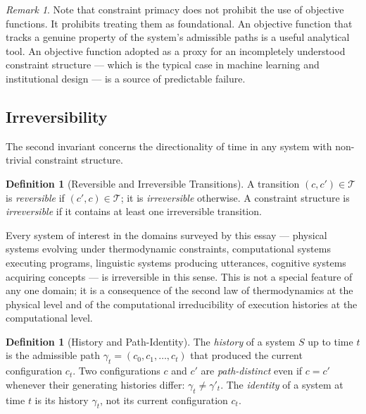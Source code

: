 \documentclass[12pt, twoside]{article}
\theoremstyle{plain}
\theoremstyle{definition}
\newtheorem{definition}[theorem]{Definition}
\theoremstyle{remark}
\newtheorem{remark}[theorem]{Remark}
\newcommand{\Trans}{\mathcal{T}}
\begin{document}
\begin{remark}
Note that constraint primacy does not prohibit the use of objective
functions.
It prohibits treating them as foundational.
An objective function that tracks a genuine property of the system's
admissible paths is a useful analytical tool.
An objective function adopted as a proxy for an incompletely understood
constraint structure — which is the typical case in machine learning and
institutional design — is a source of predictable failure.
\end{remark}

\subsection{Irreversibility}

The second invariant concerns the directionality of time in any
system with non-trivial constraint structure.

\begin{definition}[Reversible and Irreversible Transitions]
A transition $(c, c') \in \Trans$ is \emph{reversible} if
$(c', c) \in \Trans$; it is \emph{irreversible} otherwise.
A constraint structure is \emph{irreversible} if it contains at least
one irreversible transition.
\end{definition}

Every system of interest in the domains surveyed by this essay —
physical systems evolving under thermodynamic constraints,
computational systems executing programs, linguistic systems producing
utterances, cognitive systems acquiring concepts — is irreversible
in this sense.
This is not a special feature of any one domain; it is a consequence of
the second law of thermodynamics at the physical level
and of the computational irreducibility of execution histories
at the computational level.

\begin{definition}[History and Path-Identity]
The \emph{history} of a system $S$ up to time $t$ is the admissible
path $\gamma_t = (c_0, c_1, \ldots, c_t)$ that produced the current
configuration $c_t$.
Two configurations $c$ and $c'$ are \emph{path-distinct} even if $c = c'$
whenever their generating histories differ:
$\gamma_t \neq \gamma'_t$.
The \emph{identity} of a system at time $t$ is its history $\gamma_t$,
not its current configuration $c_t$.
\end{definition}
\end{document}
